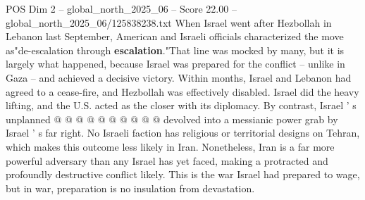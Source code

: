 \begin{textsample}{POS Dim 2 – global\_north\_2025\_06 – Score 22.00 – global\_north\_2025\_06/125838238.txt}
When Israel went after Hezbollah in Lebanon last September, American and Israeli officials characterized the move as"de-escalation through \textbf{escalation}."That line was mocked by many, but it is largely what happened, because Israel was prepared for the conflict -- unlike in Gaza -- and achieved a decisive victory.
Within months, Israel and Lebanon had agreed to a cease-fire, and Hezbollah was effectively disabled.
Israel did the heavy lifting, and the U.S. acted as the closer with its diplomacy.
By contrast, Israel ' s unplanned @ @ @ @ @ @ @ @ @ @ devolved into a messianic power grab by Israel ' s far right.
No Israeli faction has religious or territorial designs on Tehran, which makes this outcome less likely in Iran.
Nonetheless, Iran is a far more powerful adversary than any Israel has yet faced, making a protracted and profoundly destructive conflict likely.
This is the war Israel had prepared to wage, but in war, preparation is no insulation from devastation.

\end{textsample}
